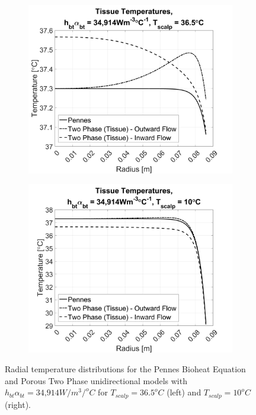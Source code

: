 \documentclass[11pt,english,a4paper,twoside,openright]{report}
\begin{document}
{{{{{{{{\begin{figure}[h]
	\centering
	\begin{subfigure}[b]{0.49\textwidth}
		\includegraphics[width=\textwidth]{1DHemisphere/figure3}
	\end{subfigure}
	\begin{subfigure}[b]{0.49\textwidth}
		\includegraphics[width=\textwidth]{1DHemisphere/figure4}
	\end{subfigure}
	\caption[Radial temperature distributions for the Pennes Bioheat Equation and Porous Two Phase unidirectional models with $h_{bt}\alpha_{bt} = \text{34,914}W/m^{3}/^{o}C$ for $T_{scalp}=36.5^{o}C$ and $T_{scalp}=10^{o}C$]{Radial temperature distributions for the Pennes Bioheat Equation and Porous Two Phase unidirectional models with $h_{bt}\alpha_{bt} = \text{34,914}W/m^{3}/^{o}C$ for $T_{scalp}=36.5^{o}C$ (left) and $T_{scalp}=10^{o}C$ (right).}
	\label{fig:Results2}
\end{figure}

}}}}}}}}
\end{document}
